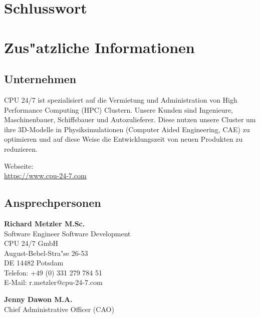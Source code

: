 \documentclass[12pt]{article}
\begin{document}
\newpage


\section{Schlusswort}
\newpage

\section{Zus"atzliche Informationen}
\subsection{Unternehmen}

CPU 24/7 ist spezialisiert auf die Vermietung und Administration
von High Performance Computing (HPC) Clustern.
Unsere Kunden sind Ingenieure, Maschinenbauer, Schiffsbauer und Autozulieferer.
Diese nutzen unsere Cluster um ihre 3D-Modelle in Physiksimulationen (Computer Aided Engineering, CAE)
zu optimieren und auf diese Weise die Entwicklungszeit von neuen Produkten zu reduzieren.

Webseite:\\
\url{https://www.cpu-24-7.com}



\subsection{Ansprechpersonen}

\textbf{Richard Metzler M.Sc.}\\
Software Engineer Software Development\\

CPU 24/7 GmbH \\
August-Bebel-Stra"se 26-53\\
DE 14482 Potsdam\\

Telefon: +49 (0) 331 279 784 51 \\
E-Mail: r.metzler@cpu-24-7.com

\bigbreak
\bigbreak
\textbf{Jenny Dawon M.A.}\\
Chief Administrative Officer (CAO)\\
\end{document}
